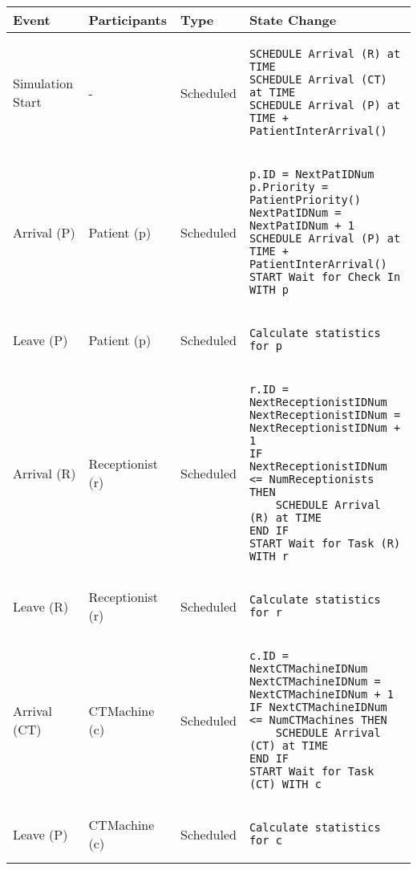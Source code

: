 \begin{longtable}{@{}>{\raggedright\arraybackslash}p{1.5cm}>{\raggedright\arraybackslash}p{2.1cm}>{\raggedright\arraybackslash}p{2.2cm}>{\raggedright\arraybackslash}p{10cm}@{}}
  \toprule
  Event          & Participants & Type       & State Change \\ \midrule
  \endhead
  Simulation Start & -  & Scheduled  & 
  \begin{lstlisting}[language=CMPseudo]
SCHEDULE Arrival (R) at TIME
SCHEDULE Arrival (CT) at TIME
SCHEDULE Arrival (P) at TIME + PatientInterArrival()
  \end{lstlisting}
  \\ \midrule
  Arrival (P) & Patient (p)  & Scheduled  & 
  \begin{lstlisting}[language=CMPseudo]
p.ID = NextPatIDNum
p.Priority = PatientPriority()
NextPatIDNum = NextPatIDNum + 1
SCHEDULE Arrival (P) at TIME + PatientInterArrival()
START Wait for Check In WITH p
  \end{lstlisting}
  \\ \midrule
  Leave (P) & Patient (p)  & Scheduled  & 
  \begin{lstlisting}[language=CMPseudo]
Calculate statistics for p
  \end{lstlisting}
  \\ \midrule
  Arrival (R) & Receptionist (r)  & Scheduled  & 
  \begin{lstlisting}[language=CMPseudo]
r.ID = NextReceptionistIDNum
NextReceptionistIDNum = NextReceptionistIDNum + 1
IF NextReceptionistIDNum <= NumReceptionists THEN
    SCHEDULE Arrival (R) at TIME
END IF
START Wait for Task (R) WITH r
  \end{lstlisting}
  \\ \midrule
  Leave (R) & Receptionist (r)  & Scheduled  & 
  \begin{lstlisting}[language=CMPseudo]
Calculate statistics for r
  \end{lstlisting}
  \\ \midrule
  Arrival (CT) & CTMachine (c)  & Scheduled  & 
  \begin{lstlisting}[language=CMPseudo]
c.ID = NextCTMachineIDNum
NextCTMachineIDNum = NextCTMachineIDNum + 1
IF NextCTMachineIDNum <= NumCTMachines THEN
    SCHEDULE Arrival (CT) at TIME
END IF
START Wait for Task (CT) WITH c
  \end{lstlisting}
  \\ \midrule
  Leave (P) & CTMachine (c)  & Scheduled  & 
  \begin{lstlisting}[language=CMPseudo]
Calculate statistics for c
  \end{lstlisting}
  \\ \bottomrule
  \end{longtable}